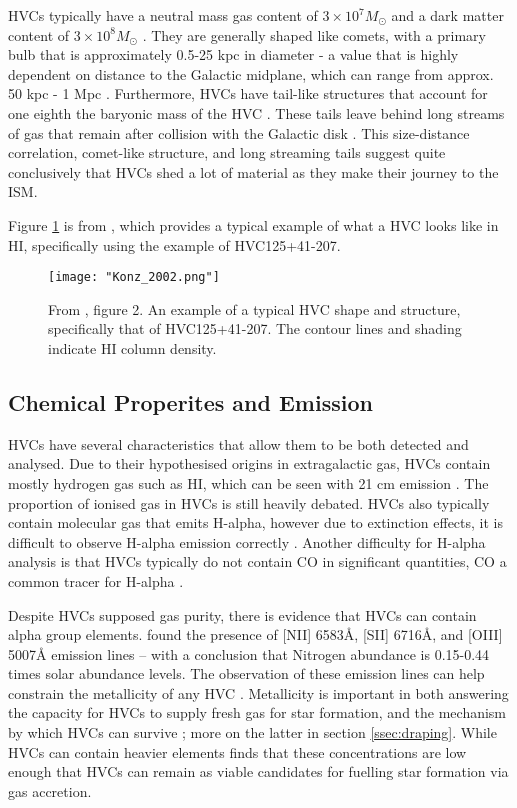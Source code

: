 HVCs typically have a neutral mass gas content of $3\times10^7 M_{\odot}$ and a dark matter content of $3\times10^8 M_{\odot}$ \citep{ID66}. They are generally shaped like comets, with a primary bulb that is approximately 0.5-25 kpc in diameter - a value that is highly dependent on distance to the Galactic midplane, which can range from approx. 50 kpc - 1 Mpc \citep{ID66, ID13}. Furthermore, HVCs have tail-like structures that account for one eighth the baryonic mass of the HVC \citep{ID13}. These tails leave behind long streams of gas that remain after collision with the Galactic disk \citep{ID19}. This size-distance correlation, comet-like structure, and long streaming tails suggest quite conclusively that HVCs shed a lot of material as they make their journey to the ISM.


Figure \ref{fig:hvc_example} is from \cite{ID13}, which provides a typical example of what a HVC looks like in HI, specifically using the example of HVC125+41-207.

\begin{figure}
    \texttt{[image: "Konz\_2002.png"]}
    \centering
    \caption{From \cite{ID13}, figure 2. An example of a typical HVC shape and structure, specifically that of HVC125+41-207. The contour lines and shading indicate HI column density.}
    \label{fig:hvc_example}
\end{figure}

\subsection{Chemical Properites and Emission}
\label{ssec:chem}

HVCs have several characteristics that allow them to be both detected and analysed. Due to their hypothesised origins in extragalactic gas, HVCs contain mostly hydrogen gas such as HI, which can be seen with 21 cm emission \citep{ID7, ID8, ID6}. The proportion of ionised gas in HVCs is still heavily debated. HVCs also typically contain molecular gas that emits H-alpha, however due to extinction effects, it is difficult to observe H-alpha emission correctly \citep{ID9, ID43}. Another difficulty for H-alpha analysis is that HVCs typically do not contain CO in significant quantities, CO a common tracer for H-alpha \citep{ID66}.


Despite HVCs supposed gas purity, there is evidence that HVCs can contain alpha group elements. \cite{ID49, ID48} found the presence of [NII] 6583{\AA}, [SII] 6716{\AA}, and [OIII] 5007{\AA} emission lines – with a conclusion that Nitrogen abundance is 0.15-0.44 times solar abundance levels. The observation of these emission lines can help constrain the metallicity of any HVC  \citep{ID49}. Metallicity is important in both answering the capacity for HVCs to supply fresh gas for star formation, and the mechanism by which HVCs can survive \citep{ID24}; more on the latter in section \ref{ssec:draping}. While HVCs can contain heavier elements \cite{ID46} finds that these concentrations are low enough that HVCs can remain as viable candidates for fuelling star formation via gas accretion.


